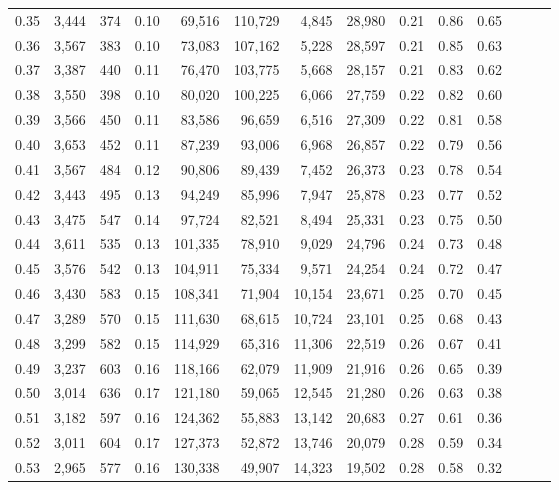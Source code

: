 \begin{tabular}{rrrrrrrrrrrrrr}
0.35 &  3,444 &  374 &  0.10 &   69,516 &  110,729 &   4,845 &  28,980 &  0.21 &  0.86 &      0.65 \\
0.36 &  3,567 &  383 &  0.10 &   73,083 &  107,162 &   5,228 &  28,597 &  0.21 &  0.85 &      0.63 \\
0.37 &  3,387 &  440 &  0.11 &   76,470 &  103,775 &   5,668 &  28,157 &  0.21 &  0.83 &      0.62 \\
0.38 &  3,550 &  398 &  0.10 &   80,020 &  100,225 &   6,066 &  27,759 &  0.22 &  0.82 &      0.60 \\
0.39 &  3,566 &  450 &  0.11 &   83,586 &   96,659 &   6,516 &  27,309 &  0.22 &  0.81 &      0.58 \\
0.40 &  3,653 &  452 &  0.11 &   87,239 &   93,006 &   6,968 &  26,857 &  0.22 &  0.79 &      0.56 \\
0.41 &  3,567 &  484 &  0.12 &   90,806 &   89,439 &   7,452 &  26,373 &  0.23 &  0.78 &      0.54 \\
0.42 &  3,443 &  495 &  0.13 &   94,249 &   85,996 &   7,947 &  25,878 &  0.23 &  0.77 &      0.52 \\
0.43 &  3,475 &  547 &  0.14 &   97,724 &   82,521 &   8,494 &  25,331 &  0.23 &  0.75 &      0.50 \\
0.44 &  3,611 &  535 &  0.13 &  101,335 &   78,910 &   9,029 &  24,796 &  0.24 &  0.73 &      0.48 \\
0.45 &  3,576 &  542 &  0.13 &  104,911 &   75,334 &   9,571 &  24,254 &  0.24 &  0.72 &      0.47 \\
0.46 &  3,430 &  583 &  0.15 &  108,341 &   71,904 &  10,154 &  23,671 &  0.25 &  0.70 &      0.45 \\
0.47 &  3,289 &  570 &  0.15 &  111,630 &   68,615 &  10,724 &  23,101 &  0.25 &  0.68 &      0.43 \\
0.48 &  3,299 &  582 &  0.15 &  114,929 &   65,316 &  11,306 &  22,519 &  0.26 &  0.67 &      0.41 \\
0.49 &  3,237 &  603 &  0.16 &  118,166 &   62,079 &  11,909 &  21,916 &  0.26 &  0.65 &      0.39 \\
0.50 &  3,014 &  636 &  0.17 &  121,180 &   59,065 &  12,545 &  21,280 &  0.26 &  0.63 &      0.38 \\
0.51 &  3,182 &  597 &  0.16 &  124,362 &   55,883 &  13,142 &  20,683 &  0.27 &  0.61 &      0.36 \\
0.52 &  3,011 &  604 &  0.17 &  127,373 &   52,872 &  13,746 &  20,079 &  0.28 &  0.59 &      0.34 \\
0.53 &  2,965 &  577 &  0.16 &  130,338 &   49,907 &  14,323 &  19,502 &  0.28 &  0.58 &      0.32 \\

\end{tabular}
